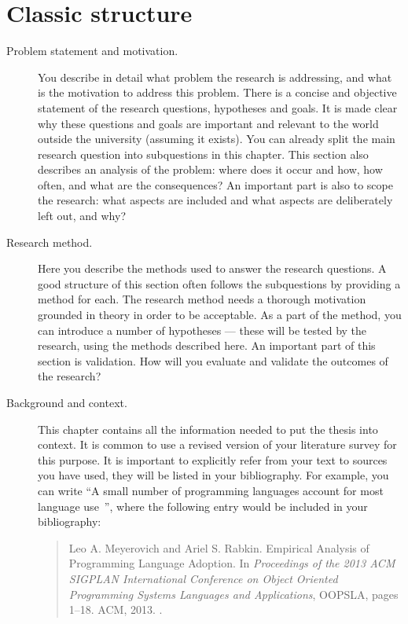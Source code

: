 \documentclass{uvamscse}
\begin{document}
\section{Classic structure}

\begin{description}
  \item[Problem statement and motivation.]
  You describe in detail what problem the research is addressing, and what is
the motivation to address this problem. There is a concise and objective
statement of the research questions, hypotheses and goals. It is made clear
why these questions and goals are important and relevant to the world outside
the university (assuming it exists). You can already split the main research
question into subquestions in this chapter. This section also describes an
analysis of the problem: where does it occur and how, how often, and what are
the consequences? An important part is also to scope the research: what
aspects are included and what aspects are deliberately left out, and why?
  \item[Research method.]
  Here you describe the methods used to answer the research questions. A good
structure of this section often follows the subquestions by providing a method
for each. The research method needs a thorough motivation grounded in theory
in order to be acceptable. As a part of the method, you can introduce a number
of hypotheses --- these will be tested by the research, using the methods
described here. An important part of this section is validation. How will you
evaluate and validate the outcomes of the research?
  \item[Background and context.]
  This chapter contains all the information needed to put the thesis into
context. It is common to use a revised version of your literature survey for
this purpose. It is important to explicitly refer from your text to sources
you have used, they will be listed in your bibliography. For example, you can
write ``A small number of programming languages account for most language
use~\cite{MeyerovichR2013}'', where the following entry would be included in
your bibliography:
\begin{quote}
\cite{MeyerovichR2013} Leo A. Meyerovich and Ariel S. Rabkin. Empirical Analysis of Programming Language Adoption. In \emph{Proceedings of the 2013 ACM SIGPLAN International Conference on Object Oriented Programming Systems Languages and Applications}, OOPSLA, pages 1--18. ACM, 2013. .
\end{quote}

\end{description}
\end{document}
